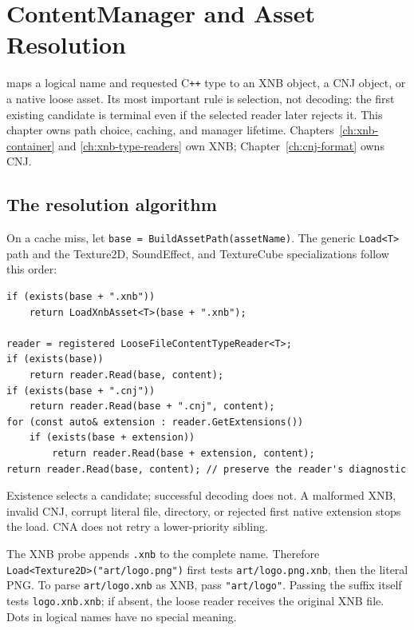 \chapter[ContentManager and Asset Resolution]{ContentManager and Asset \mbox{Resolution}}
\label{ch:contentmanager-resolution}
\label{ch:content-and-assets}

 maps a logical name and requested C\texttt{++} type to an XNB object,
a CNJ object, or a native loose asset. Its most important rule is selection, not decoding: the
first existing candidate is terminal even if the selected reader later rejects it. This chapter
owns path choice, caching, and manager lifetime. Chapters~\ref{ch:xnb-container} and
\ref{ch:xnb-type-readers} own XNB; Chapter~\ref{ch:cnj-format} owns CNJ.



\section{The resolution algorithm}

On a cache miss, let \texttt{base = BuildAssetPath(assetName)}. The generic
\texttt{Load<T>} path and the Texture2D, SoundEffect, and TextureCube specializations follow this
order:

\begin{lstlisting}
if (exists(base + ".xnb"))
    return LoadXnbAsset<T>(base + ".xnb");

reader = registered LooseFileContentTypeReader<T>;
if (exists(base))
    return reader.Read(base, content);
if (exists(base + ".cnj"))
    return reader.Read(base + ".cnj", content);
for (const auto& extension : reader.GetExtensions())
    if (exists(base + extension))
        return reader.Read(base + extension, content);
return reader.Read(base, content); // preserve the reader's diagnostic
\end{lstlisting}

\begin{contractnote}
Existence selects a candidate; successful decoding does not. A malformed XNB, invalid CNJ,
corrupt literal file, directory, or rejected first native extension stops the load. CNA does not
retry a lower-priority sibling.
\end{contractnote}

The XNB probe appends \texttt{.xnb} to the complete name. Therefore
\texttt{Load<Texture2D>("art/logo.png")} first tests \texttt{art/logo.png.xnb}, then the literal
PNG. To parse \texttt{art/logo.xnb} as XNB, pass \texttt{"art/logo"}. Passing the suffix itself
tests \texttt{logo.xnb.xnb}; if absent, the loose reader receives the original XNB file.
Dots in logical names have no special meaning.


